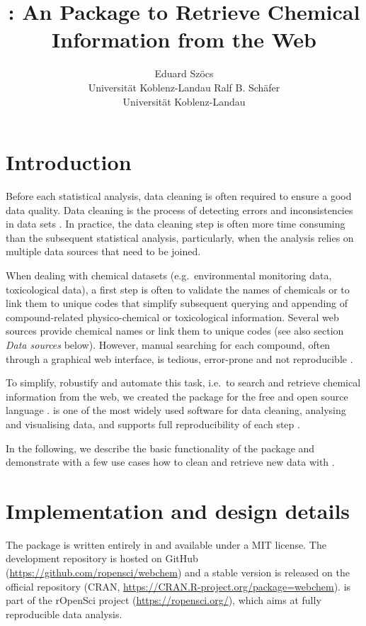 \documentclass[article, shortnames]{jss}\usepackage[]{graphicx}\usepackage[]{color}
\author{Eduard Sz\"ocs\\Universit\"at Koblenz-Landau \And 
        Ralf B. Sch\"afer\\Universit\"at Koblenz-Landau}
\title{\pkg{webchem}: An \proglang{R} Package to Retrieve Chemical Information from the Web}
\begin{document}
\section[Introduction]{Introduction}
Before each statistical analysis, data cleaning is often required to ensure a good data quality.
Data cleaning is the process of detecting errors and inconsistencies in data sets \citep{Chapman_2005}.
In practice, the data cleaning step is often more time consuming than the subsequent statistical analysis, particularly, when the analysis relies on multiple data sources that need to be joined.

When dealing with chemical datasets (e.g.\ environmental monitoring data, toxicological data), a first step is often to validate the names of chemicals or to link them to unique codes that simplify subsequent querying and appending of compound-related physico-chemical or toxicological information.
Several web sources provide chemical names or link them to unique codes (see also section \emph{Data sources} below).
However, manual searching for each compound, often through a graphical web interface, is tedious, error-prone and not reproducible \citep{Peng_2009}.

To simplify, robustify and automate this task, i.e.\ to search and retrieve chemical information from the web, we created the  package for the free and open source  language \citep{r_2015, Wehrens_2011}.
 is one of the most widely used software for data cleaning, analysing and visualising data, and supports full reproducibility of each step \citep{Marwick_2016}.

In the following, we describe the basic functionality of the package and demonstrate with a few use cases how to clean and retrieve new data with .


\section[Implementation and design details]{Implementation and design details}
The  package is written entirely in  and available under a MIT license.
The development repository is hosted on GitHub (\url{https://github.com/ropensci/webchem}) and a stable version is released on the official  repository (CRAN, \url{https://CRAN.R-project.org/package=webchem}).
 is part of the rOpenSci project (\url{https://ropensci.org/}), which aims at fully reproducible data analysis.
\end{document}
